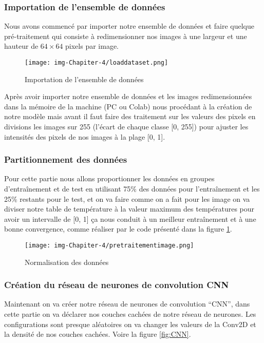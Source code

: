 \documentclass[12pt]{article}
\begin{document}
\subsubsection*{Importation de l'ensemble de données}

Nous avons commencé par importer notre ensemble de données et faire quelque pré-traitement qui consiste à redimensionner nos images à une largeur et une hauteur de $64 \times 64$ pixels par image.

\begin{figure}[h]
	\centering
	\texttt{[image: img-Chapiter-4/loaddataset.png]}
	\caption{Importation de l'ensemble de données}
\end{figure}

Après avoir importer notre ensemble de données et les images redimensionnées dans la mémoire de la machine (PC ou Colab) nous procédant à la création de notre modèle mais avant il faut faire des traitement sur les valeurs des pixels en divisions les images sur 255 (l’écart de chaque classe [0, 255]) pour ajuster les intensités des pixels de nos images à la plage [0, 1].

\subsubsection*{Partitionnement des données}
Pour cette partie nous allons proportionner les données en groupes d’entraînement et de test en utilisant 75\% des données pour l’entraînement et les 25\% restants pour le test, et on va faire comme on a fait pour les image on va diviser notre table de température à la valeur maximum des températures pour avoir un intervalle de [0, 1] ça nous conduit à un meilleur entraînement et à une bonne convergence, comme réaliser par le code présenté dans la figure \ref{fig:pretrai}.
\newpage
\begin{figure}[h]
	\centering
	\texttt{[image: img-Chapiter-4/pretraitementimage.png]}
	\caption{Normalisation des données}
	\label{fig:pretrai}
\end{figure}

\subsubsection*{Création du réseau de neurones de convolution CNN}

Maintenant on va créer notre réseau de neurones de convolution “CNN”, dans cette partie on va déclarer nos couches cachées de notre réseau de neurones. Les configurations sont presque aléatoires on va changer les valeurs de la Conv2D et la densité de nos couches cachées. Voire la figure \ref{fig:CNN}.
\end{document}
